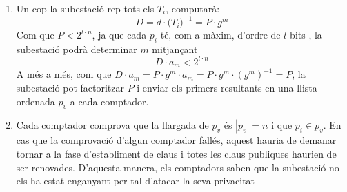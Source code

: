 \begin{enumerate}
\begin{enumerate}
		\item Un cop la subestació rep tots els $T_i$, computarà:
		\[D = d \cdot \Big( T_i \Big)^{-1} = P \cdot g^m\]
		Com que $P < 2^{l \cdot n}$, ja que cada $p_i$ té, com a màxim, d'ordre de $l$ bits , la subestació podrà determinar $m$ mitjançant
		\[D \cdot a_m  < 2^{l \cdot n}\]
		A més a més, com que $D \cdot a_m = P \cdot g^m \cdot a_m = P \cdot g^m \cdot (g^m)^{-1} = P$, la subestació pot factoritzar $P$ i enviar els primers resultants en una llista ordenada $p_v$ a cada comptador.
		\item Cada comptador comprova que la llargada de $p_v$ és $|p_v| = n$ i que $p_i \in p_v$. En cas que la comprovació d'algun comptador fallés, aquest hauria de demanar tornar a la fase d'establiment de claus i totes les claus publiques haurien de ser renovades. D'aquesta manera, els comptadors saben que la subestació no els ha estat enganyant per tal d'atacar la seva privacitat
		
	\end{enumerate}
\end{enumerate}


